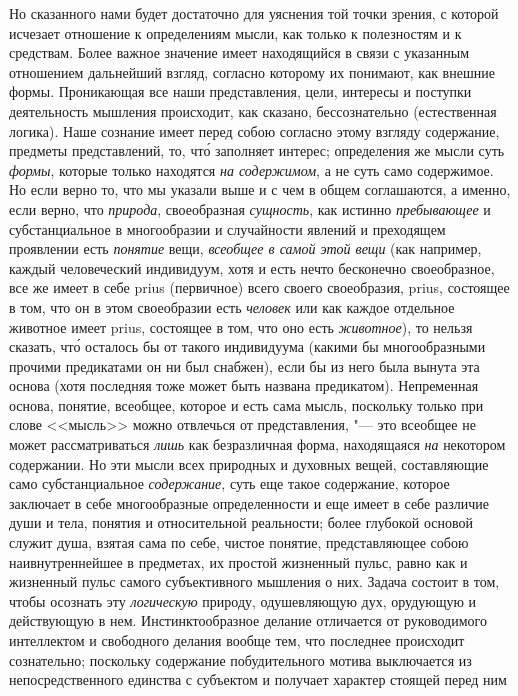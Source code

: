 Но сказанного нами будет достаточно для уяснения той точки зрения, с которой
исчезает отношение к определениям мысли, как только к полезностям и к
средствам. Более важное значение имеет находящийся в связи с указанным
отношением дальнейший взгляд, согласно которому их понимают, как внешние формы.
Проникающая все наши представления, цели, интересы и поступки деятельность
мышления происходит, как сказано, бессознательно (естественная логика). Наше
сознание имеет перед собою согласно этому взгляду содержание, предметы
представлений, то, чт\'{о} заполняет интерес; определения же мысли суть
{\em формы}, которые только находятся {\em на содержимом}, а не суть само
содержимое. Но если верно то, что мы указали выше и с чем в общем соглашаются,
а именно, если верно, что {\em природа}, своеобразная {\em сущность}, как
истинно {\em пребывающее} и субстанциальное в многообразии и случайности
явлений и преходящем проявлении есть {\em понятие} вещи, {\em всеобщее в самой
этой вещи} (как например, каждый человеческий индивидуум, хотя и есть нечто
бесконечно своеобразное, все же имеет в себе prius (первичное) всего своего
своеобразия, prius, состоящее в том, что он в этом своеобразии есть
{\em человек} или как каждое отдельное животное имеет prius, состоящее в том,
что оно есть {\em животное}), то нельзя сказать, чт\'{о} осталось бы от такого
индивидуума (какими бы многообразными прочими предикатами он ни был снабжен),
если бы из него была вынута эта основа (хотя последняя тоже может быть названа
предикатом). Непременная основа, понятие, всеобщее, которое и есть сама мысль,
поскольку только при слове <<мысль>> можно отвлечься от представления, "--- это
всеобщее не может рассматриваться {\em лишь} как безразличная форма,
находящаяся {\em на} некотором содержании. Но эти мысли всех природных и
духовных вещей, составляющие само субстанциальное {\em содержание}, суть еще
такое содержание, которое заключает в себе многообразные определенности и еще
имеет в себе различие души и тела, понятия и относительной реальности; более
глубокой основой служит душа, взятая сама по себе, чистое понятие,
представляющее собою наивнутреннейшее в предметах, их простой жизненный пульс,
равно как и жизненный пульс самого субъективного мышления о них. Задача состоит
в том, чтобы осознать эту {\em логическую} природу, одушевляющую дух, орудующую
и действующую в нем. Инстинктообразное делание отличается от руководимого
интеллектом и свободного делания вообще тем, что последнее происходит
сознательно; поскольку содержание побудительного мотива выключается из
непосредственного единства с субъектом и получает характер стоящей перед ним
